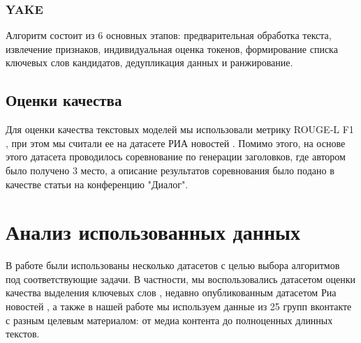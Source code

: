 \documentclass[14pt]{matmex-diploma-custom}
\begin{document}
%

\subsubsection{YAKE}
Алгоритм состоит из 6 основных этапов: предварительная обработка текста, извлечение признаков, индивидуальная оценка токенов, формирование списка ключевых слов кандидатов, дедупликация данных и ранжирование.


\subsection{Оценки качества}
Для оценки качества текстовых моделей мы использовали метрику ROUGE-L F1 \cite{Lin:2004},
при этом мы считали ее на датасете РИА новостей \cite{gavrilov2018self}. Помимо этого,
на основе этого датасета проводилось соревнование по генерации заголовков, где автором было
получено 3 место, а описание результатов соревнования было подано в качестве статьи на конференцию
"Диалог".



\section{Анализ использованных данных}

В работе были использованы несколько датасетов с целью выбора алгоритмов под соответствующие задачи.
В частности, мы воспользовались датасетом оценки качества выделения ключевых слов \cite{mannefedov2019}, недавно
опубликованным датасетом Риа новостей \cite{gavrilov2018self}, а также в нашей работе мы используем
данные из 25 групп вконтакте с разным целевым материалом: от медиа контента до полноценных длинных
текстов.
\end{document}
